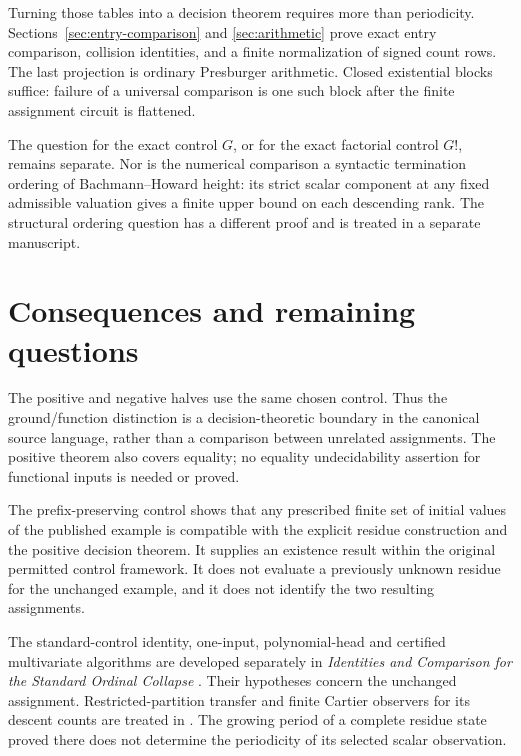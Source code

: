 \documentclass[11pt,a4paper]{article}
\numberwithin{equation}{section}
\theoremstyle{definition}
\theoremstyle{remark}
\begin{document}
Turning those tables into a decision theorem requires more than
periodicity. Sections~\ref{sec:entry-comparison} and
\ref{sec:arithmetic} prove exact entry comparison, collision identities,
and a finite normalization of signed count rows. The last projection is
ordinary Presburger arithmetic. Closed existential blocks suffice:
failure of a universal comparison is one such block after the finite
assignment circuit is flattened.

The question for the exact control \(G\), or for the exact factorial
control \(G!\), remains separate. Nor is the numerical comparison a
syntactic termination ordering of Bachmann--Howard height: its strict
scalar component at any fixed admissible valuation gives a finite upper
bound on each descending rank. The structural ordering question has a
different proof and is treated in a separate manuscript.









\section{Consequences and remaining questions}

The positive and negative halves use the same chosen control. Thus the
ground/function distinction is a decision-theoretic boundary in the
canonical source language, rather than a comparison between unrelated
assignments. The positive theorem also covers equality; no equality
undecidability assertion for functional inputs is needed or proved.

The prefix-preserving control shows that any prescribed finite set of
initial values of the published example is compatible with the explicit
residue construction and the positive decision theorem.
It supplies an existence result within the original permitted control
framework. It does not evaluate a previously unknown residue for the
unchanged example, and it does not identify the two resulting assignments.

The standard-control identity, one-input, polynomial-head and certified
multivariate algorithms are developed separately in
\emph{Identities and Comparison for the Standard Ordinal Collapse}
\cite{standardcomparison}. Their hypotheses concern the unchanged
assignment. Restricted-partition transfer and finite Cartier observers
for its descent counts are treated in \cite{modularcounts}. The growing
period of a complete residue state proved there does not determine the
periodicity of its selected scalar observation.
\end{document}
